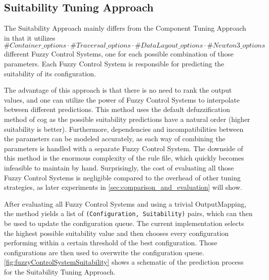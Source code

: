 \subsection{Suitability Tuning Approach}

The Suitability Approach mainly differs from the Component Tuning Approach in that it utilizes $\#Container\_options \cdot \#Traversal\_options \cdot \#DataLayout\_options \cdot \#Newton3\_options$ different Fuzzy Control Systems, one for each possible combination of those parameters. Each Fuzzy Control System is responsible for predicting the suitability of its configuration.

The advantage of this approach is that there is no need to rank the output values, and one can utilize the power of Fuzzy Control Systems to interpolate between different predictions. This method uses the default defuzzification method of \gls{cog} as the possible suitability predictions have a natural order (higher suitability is better). Furthermore, dependencies and incompatibilities between the parameters can be modeled accurately, as each way of combining the parameters is handled with a separate Fuzzy Control System. The downside of this method is the enormous complexity of the rule file, which quickly becomes infeasible to maintain by hand. Surprisingly, the cost of evaluating all those Fuzzy Control Systems is negligible compared to the overhead of other tuning strategies, as later experiments in \autoref{sec:comparison_and_evaluation} will show.


After evaluating all Fuzzy Control Systems and using a trivial OutputMapping, the method yields a list of \texttt{(Configuration, Suitability)} pairs, which can then be used to update the configuration queue. The current implementation selects the highest possible suitability value and then chooses every configuration performing within a certain threshold of the best configuration. Those configurations are then used to overwrite the configuration queue. \autoref{fig:fuzzyControlSystemSuitability} shows a schematic of the prediction process for the Suitability Tuning Approach.

